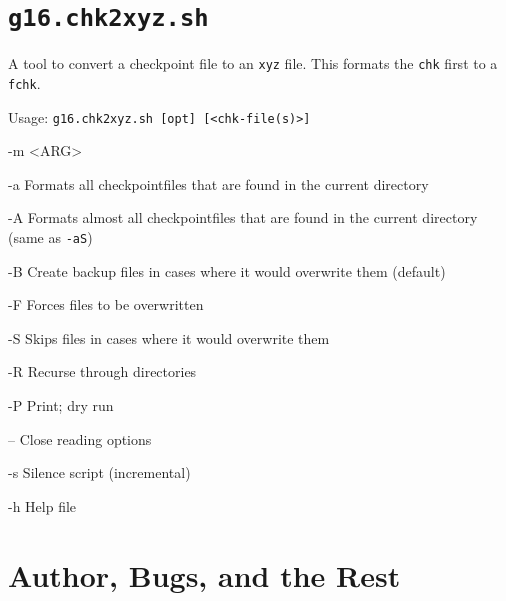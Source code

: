 \documentclass[   %
  final,          %
  a4paper,        %
  rscols=3,       %
  margin=1.0cm,   %
]{refsheet}
\begin{document}
\section{\texttt{g16.chk2xyz.sh}}

A tool to convert a checkpoint file to an \texttt{xyz} file. 
This formats the \texttt{chk} first to a \texttt{fchk}.

Usage: \texttt{g16.chk2xyz.sh [opt] [<chk-file(s)>]}

\begin{rslisttt}{-m <ARG>}
  \item[-a      ] Formats all checkpointfiles that are found in the current directory
  \item[-A      ] Formats almost all checkpointfiles that are found in the current directory (same as \texttt{-aS})
  \item[-B      ] Create backup files in cases where it would overwrite them (default)
  \item[-F      ] Forces files to be overwritten
  \item[-S      ] Skips files in cases where it would overwrite them
  \item[-R      ] Recurse through directories
  \item[-P      ] Print; dry run
  \item[--      ] Close reading options
  \item[-s      ] Silence script (incremental)
  \item[-h      ] Help file 
\end{rslisttt}

\vfill
\section{Author, Bugs, and the Rest}

\end{document}
